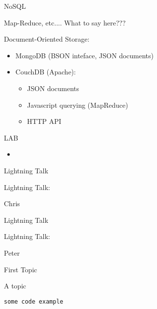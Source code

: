 \documentclass{beamer}
\begin{document}
\begin{frame}[fragile]{NoSQL}

Map-Reduce, etc....
What to say here???

Document-Oriented Storage: 
\begin{itemize}
  \item MongoDB (BSON inteface, JSON documents)
  \item CouchDB (Apache):
  \begin{itemize}
    \item  JSON documents
    \item  Javascript querying (MapReduce)  
    \item  HTTP API  
  \end{itemize}
\end{itemize}

\end{frame} 


\begin{frame}{LAB}

\begin{itemize}
  \item
\end{itemize}

\end{frame}

\begin{frame}{Lightning Talk}

{\centering

\vfill
{\LARGE Lightning Talk:  }

\vfill
{\Huge Chris}

\vfill
}
\end{frame}

\begin{frame}{Lightning Talk}

{\centering

\vfill
{\LARGE Lightning Talk:  }

\vfill
{\Huge Peter}

\vfill
}
\end{frame}


\begin{frame}[fragile]{First Topic}

 {\Large A topic}

\begin{verbatim}
some code example
\end{verbatim}

\end{frame} 
\end{document}
